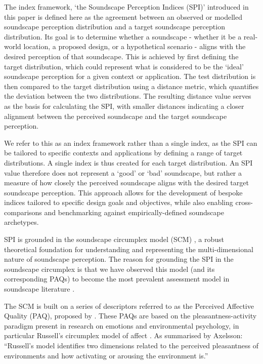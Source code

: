 \documentclass[
  authoryear,
  preprint,
  3p]{elsarticle}
\begin{document}
The index framework, `the Soundscape Perception Indices (SPI)'
introduced in this paper is defined here as the agreement between an
observed or modelled soundscape perception distribution and a target
soundscape perception distribution. Its goal is to determine whether a
soundscape - whether it be a real-world location, a proposed design, or
a hypothetical scenario - aligns with the desired perception of that
soundscape. This is achieved by first defining the target distribution,
which could represent what is considered to be the `ideal' soundscape
perception for a given context or application. The test distribution is
then compared to the target distribution using a distance metric, which
quantifies the deviation between the two distributions. The resulting
distance value serves as the basis for calculating the SPI, with smaller
distances indicating a closer alignment between the perceived soundscape
and the target soundscape perception.

We refer to this as an index framework rather than a single index, as
the SPI can be tailored to specific contexts and applications by
defining a range of target distributions. A single index is thus created
for each target distribution. An SPI value therefore does not represent
a `good' or `bad' soundscape, but rather a measure of how closely the
perceived soundscape aligns with the desired target soundscape
perception. This approach allows for the development of bespoke indices
tailored to specific design goals and objectives, while also enabling
cross-comparisons and benchmarking against empirically-defined
soundscape archetypes.

SPI is grounded in the soundscape circumplex model (SCM)
\citep{Axelsson2010principal, Axelsson2012Swedish}, a robust theoretical
foundation for understanding and representing the multi-dimensional
nature of soundscape perception. The reason for grounding the SPI in the
soundscape circumplex is that we have observed this model (and its
corresponding PAQs) to become the most prevalent assessment model in
soundscape literature \citep{Aletta2023Adoption}.

The SCM is built on a series of descriptors referred to as the Perceived
Affective Quality (PAQ), proposed by \citep{Axelsson2010principal}.
These PAQs are based on the pleasantness-activity paradigm present in
research on emotions and environmental psychology, in particular
Russell's circumplex model of affect \citep{Russell1980circumplex}. As
summarised by Axelsson: ``Russell's model identifies two dimensions
related to the perceived pleasantness of environments and how activating
or arousing the environment is.''
\end{document}
